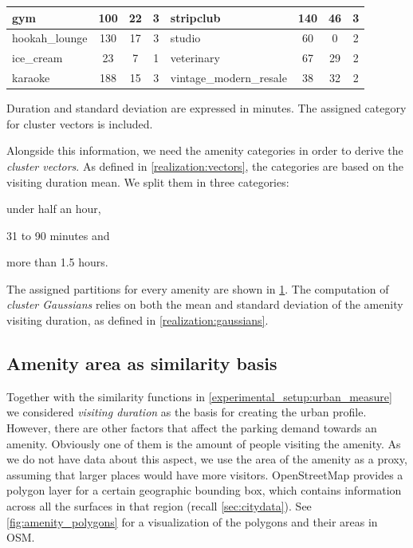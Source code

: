 \begin{table}[!ht]
{\begin{tabular}{ | l | c | c | c || l | c | c | c |}
		gym  & 100 & 22 & 3 &  stripclub  & 140 & 46 & 3 \\ \hline
		hookah\_lounge  & 130 & 17 & 3 &  studio  & 60 & 0 & 2 \\ \hline
		ice\_cream  & 23 & 7 & 1 &  veterinary  & 67 & 29 & 2 \\ \hline
		karaoke  & 188 & 15 & 3 & {\scriptsize vintage\_modern\_resale}  & 38 & 32 & 2 \\ \hline
	\end{tabular}}
	\label{tab:amenities_google_places}
	\begin{tabnote}
		Duration and standard deviation are expressed in minutes. The assigned category for cluster vectors is included.
	\end{tabnote}
\end{table}

Alongside this information, we need the amenity categories in order to derive the \textit{cluster vectors}.
As defined in \cref{realization:vectors}, the categories are based on the visiting duration mean.
We split them in three categories: 
\begin{romanlist}
	\item under half an hour,
	\item 31 to 90 minutes and
	\item more than 1.5 hours. 
\end{romanlist}
The assigned partitions for every amenity are shown in \cref{tab:amenities_google_places}. 
The computation of \textit{cluster Gaussians} relies on both the mean and standard deviation of the amenity visiting duration, as defined in \cref{realization:gaussians}.

\subsection{Amenity area as similarity basis}
\label{experimental_setup:amenity_area}
Together with the similarity functions in \cref{experimental_setup:urban_measure} we considered \textit{visiting duration} as the basis for creating the urban profile. However, there are other factors that affect the parking demand towards an amenity.
Obviously one of them is the amount of people visiting the amenity.
As we do not have data about this aspect, we use the area of the amenity as a proxy, assuming that larger places would have more visitors.
OpenStreetMap provides a polygon layer for a certain geographic bounding box, which contains information across all the surfaces in that region (recall \cref{sec:citydata}). See \cref{fig:amenity_polygons} for a visualization of the polygons and their areas in OSM. 


